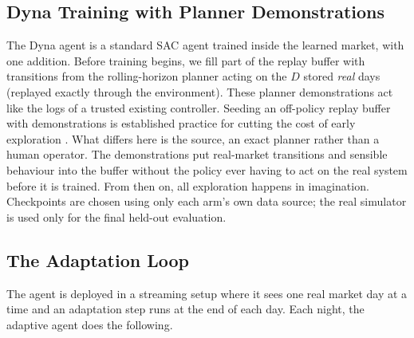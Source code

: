 \documentclass[conference]{IEEEtran}
\begin{document}
\subsection{Dyna Training with Planner Demonstrations}
\label{sec:dyna-training}

The Dyna agent is a standard SAC agent trained inside the learned market, with one addition. Before training begins, we fill part of the replay buffer with transitions from the rolling-horizon planner acting on the $D$ stored \emph{real} days (replayed exactly through the environment). These planner demonstrations act like the logs of a trusted existing controller. Seeding an off-policy replay buffer with demonstrations is established practice for cutting the cost of early exploration \citep{hester2018dqfd, vecerik2017ddpgfd}. What differs here is the source, an exact planner rather than a human operator. The demonstrations put real-market transitions and sensible behaviour into the buffer without the policy ever having to act on the real system before it is trained. From then on, all exploration happens in imagination. Checkpoints are chosen using only each arm's own data source; the real simulator is used only for the final held-out evaluation.

\subsection{The Adaptation Loop}
\label{sec:adaptation-loop}

The agent is deployed in a streaming setup where it sees one real market day at a time and an adaptation step runs at the end of each day. Each night, the adaptive agent does the following.
\end{document}
